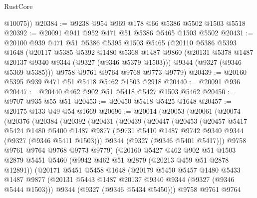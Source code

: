 \begin{lexlean}{RustCore}
\begin{coremodule}
        @10075))
@20384 := @9238 @954 @969 @178 @66 @5386 @5502 @1503 @5518
@20392 := @20091 @941 @952 @471 @51 @5386 @5465 @1503 @5502
@20431 := @20100
    @939
    @471
    @51
    @5386
    @5395
    @1503
    @5465
    (@20110
      @5386
      @5393
      @1648
      (@20117
        @5385
        @5392
        @1480
        @5368
        @1487
        @9860
        (@20131 @5378 @1487 @20137 @9340 @9344 (@9327 (@9346 @5379 @1503)))
        @9344
        (@9327 (@9346 @5369 @5385)))
      @9758
      @9761
      @9764
      @9768
      @9773
      @9779)
@20439 := @20160 @5395 @939 @471 @51 @5418 @5462 @1503 @2918
@20440 := @20091 @936
@20447 := @20440 @462 @902 @51 @5418 @5427 @1503 @5462
@20450 := @9707 @935 @55 @51
@20453 := @20450 @5418 @5425 @1648
@20457 := @20175 @133 @49 @54 @1669
@20696 := @20014
    (@20053
      (@20061
        (@20074
          (@20376
            (@20384
              (@20392
                (@20431
                  (@20439
                    (@20447
                      (@20453
                        (@20457
                          @5417
                          @5424
                          @1480
                          @5400
                          @1487
                          @9877
                          (@9731 @5410 @1487 @9742 @9340 @9344 (@9327 (@9346 @5411 @1503)))
                          @9344
                          (@9327 (@9346 @5401 @5417)))
                        @9758
                        @9761
                        @9764
                        @9768
                        @9773
                        @9779)
                      (@20160
                        @5427
                        @462
                        @902
                        @51
                        @1503
                        @2879
                        @5451
                        @5460
                        (@9942 @462 @51 @2879 (@20213 @459 @51 @2878 @12891))
                        (@20171
                          @5451
                          @5458
                          @1648
                          (@20179
                            @5450
                            @5457
                            @1480
                            @5433
                            @1487
                            @9877
                            (@20131 @5443 @1487 @20137 @9340 @9344 (@9327 (@9346 @5444 @1503)))
                            @9344
                            (@9327 (@9346 @5434 @5450)))
                          @9758
                          @9761
                          @9764

\end{coremodule}
\end{lexlean}
